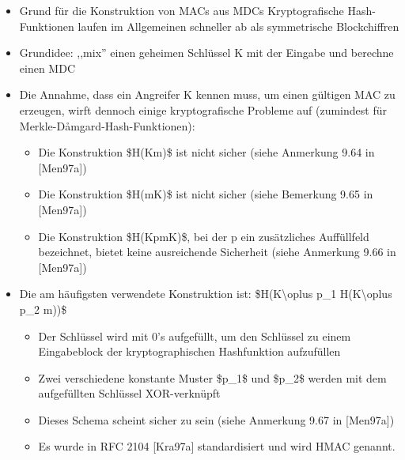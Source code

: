 \documentclass[a4paper]{article}
\begin{document}
\begin{multicols}{3}
    \begin{itemize}
        \item
              Grund für die Konstruktion von MACs aus MDCs Kryptografische
              Hash-Funktionen laufen im Allgemeinen schneller ab als symmetrische
              Blockchiffren
        \item
              Grundidee: ,,mix'' einen geheimen Schlüssel K mit der Eingabe und
              berechne einen MDC
        \item
              Die Annahme, dass ein Angreifer K kennen muss, um einen gültigen MAC
              zu erzeugen, wirft dennoch einige kryptografische Probleme auf
              (zumindest für Merkle-Dåmgard-Hash-Funktionen):

              \begin{itemize}
                  \item
                        Die Konstruktion \$H(K\textbar\textbar m)\$ ist nicht sicher (siehe
                        Anmerkung 9.64 in {[}Men97a{]})
                  \item
                        Die Konstruktion \$H(m\textbar\textbar K)\$ ist nicht sicher (siehe
                        Bemerkung 9.65 in {[}Men97a{]})
                  \item
                        Die Konstruktion
                        \$H(K\textbar\textbar p\textbar\textbar m\textbar\textbar K)\$, bei
                        der p ein zusätzliches Auffüllfeld bezeichnet, bietet keine
                        ausreichende Sicherheit (siehe Anmerkung 9.66 in {[}Men97a{]})
              \end{itemize}
        \item
              Die am häufigsten verwendete Konstruktion ist:
              \$H(K\textbackslash oplus p\_1\textbar\textbar{}
              H(K\textbackslash oplus p\_2\textbar\textbar{} m))\$

              \begin{itemize}
                  \item
                        Der Schlüssel wird mit 0's aufgefüllt, um den Schlüssel zu einem
                        Eingabeblock der kryptographischen Hashfunktion aufzufüllen
                  \item
                        Zwei verschiedene konstante Muster \$p\_1\$ und \$p\_2\$ werden mit
                        dem aufgefüllten Schlüssel XOR-verknüpft
                  \item
                        Dieses Schema scheint sicher zu sein (siehe Anmerkung 9.67 in
                        {[}Men97a{]})
                  \item
                        Es wurde in RFC 2104 {[}Kra97a{]} standardisiert und wird HMAC
                        genannt.
              \end{itemize}
    \end{itemize}



\end{multicols}
\end{document}
